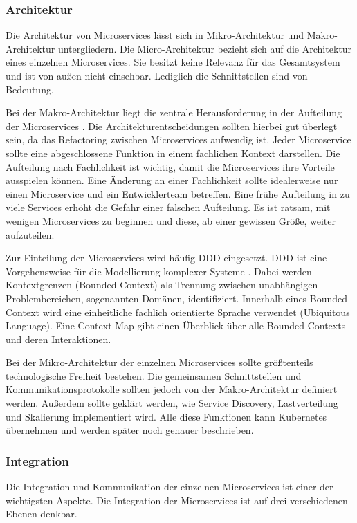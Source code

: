 \subsubsection{Architektur}
Die Architektur von Microservices lässt sich in Mikro-Architektur und Makro-Architektur untergliedern. Die Micro-Architektur bezieht sich auf die Architektur eines einzelnen Microservices. Sie besitzt keine Relevanz für das Gesamtsystem und ist von außen nicht einsehbar. Lediglich die Schnittstellen sind von Bedeutung.

Bei der Makro-Architektur liegt die zentrale Herausforderung in der Aufteilung der Microservices \parencite[vgl.][S. 102]{wolffMicroservices2018}. Die Architekturentscheidungen sollten hierbei gut überlegt sein, da das Refactoring zwischen Microservices aufwendig ist. Jeder Microservice sollte eine abgeschlossene Funktion in einem fachlichen Kontext darstellen. Die Aufteilung nach Fachlichkeit ist wichtig, damit die Microservices ihre Vorteile ausspielen können. Eine Änderung an einer Fachlichkeit sollte idealerweise nur einen Microservice und ein Entwicklerteam betreffen. Eine frühe Aufteilung in zu viele Services erhöht die Gefahr einer falschen Aufteilung. Es ist ratsam, mit wenigen Microservices zu beginnen und diese, ab einer gewissen Größe, weiter aufzuteilen.

Zur Einteilung der Microservices wird häufig \ac{DDD} eingesetzt. \ac{DDD} ist eine Vorgehensweise für die Modellierung komplexer Systeme \parencite[vgl.][S. 66]{evansDomainDriven2015}. Dabei werden Kontextgrenzen (Bounded Context) als Trennung zwischen unabhängigen Problembereichen, sogenannten Domänen, identifiziert. Innerhalb eines Bounded Context wird eine einheitliche fachlich orientierte Sprache verwendet  (Ubiquitous Language). Eine Context Map gibt einen Überblick über alle Bounded Contexts und deren Interaktionen.

Bei der Mikro-Architektur der einzelnen Microservices sollte größtenteils technologische Freiheit bestehen. Die gemeinsamen Schnittstellen und Kommunikationsprotokolle sollten jedoch von der Makro-Architektur definiert werden. Außerdem sollte geklärt werden, wie Service Discovery, Lastverteilung und Skalierung implementiert wird. Alle diese Funktionen kann Kubernetes übernehmen und werden später noch genauer beschrieben.

\subsubsection{Integration}
Die Integration und Kommunikation der einzelnen Microservices ist einer der wichtigsten Aspekte. Die Integration der Microservices ist auf drei verschiedenen Ebenen denkbar.

